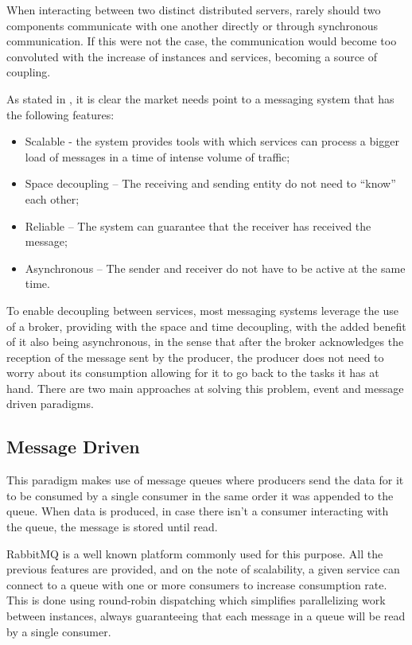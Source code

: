 When interacting between two distinct distributed servers, rarely should two
components communicate with one another directly or through synchronous
communication. If this were not the case, the communication would become too
convoluted with the increase of instances and services, becoming a source of
coupling. 

As stated in \cite{sharvari2019study}, it is clear the market needs point to a
messaging system that has the following features:
\begin{itemize}
    \item Scalable - the system provides tools with which services can process a
        bigger load of messages in a time of intense volume of traffic;
    \item Space decoupling – The receiving and sending entity do not need to
        “know” each other;
    \item Reliable – The system can guarantee that the receiver has received the
        message;
    \item Asynchronous  – The sender and receiver do not have to be active at
        the same time.
\end{itemize}

To enable decoupling between services, most messaging systems leverage the use
of a broker, providing with the space and time decoupling, with the added
benefit of it also being asynchronous, in the sense that after the broker
acknowledges the reception of the message sent by the producer, the producer
does not need to worry about its consumption allowing for it to go back to the
tasks it has at hand. There are two main approaches at solving this problem,
event and message driven paradigms.

\subsection{Message Driven}

This paradigm makes use of message queues where producers send the data for it
to be consumed by a single consumer in the same order it was appended to the
queue. When data is produced, in case there isn’t a consumer interacting with
the queue, the message is stored until read. 

RabbitMQ is a well known platform commonly used for this purpose. All the
previous features are provided, and on the note of scalability, a given service
can connect to a queue with one or more consumers to increase consumption rate.
This is done using round-robin dispatching \cite{RabbitMQscale} which simplifies
parallelizing work between instances, always guaranteeing that each message in a
queue will be read by a single consumer.

